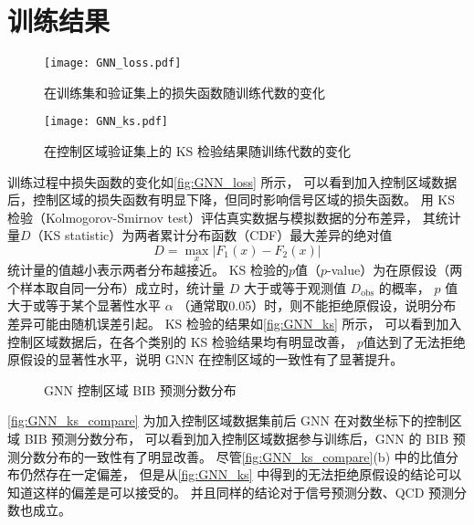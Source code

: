 \section{训练结果}
\begin{figure}[ht]
    \centering
    \texttt{[image: GNN\_loss.pdf]}
    \caption{在训练集和验证集上的损失函数随训练代数的变化}
    \label{fig:GNN_loss}
\end{figure}

\begin{figure}[ht]
    \centering
    \texttt{[image: GNN\_ks.pdf]}
    \caption{在控制区域验证集上的 KS 检验结果随训练代数的变化}
    \label{fig:GNN_ks}
\end{figure}

训练过程中损失函数的变化如\autoref{fig:GNN_loss} 所示，
可以看到加入控制区域数据后，控制区域的损失函数有明显下降，但同时影响信号区域的损失函数。
用 KS 检验（Kolmogorov-Smirnov test）评估真实数据与模拟数据的分布差异，
其统计量$D$（KS statistic）为两者累计分布函数（CDF）最大差异的绝对值
\begin{equation}
    D = \max\limits_{x} |F_1(x) - F_2(x)|
\end{equation}
统计量的值越小表示两者分布越接近。
KS 检验的$p$值（$p$-value）为在原假设（两个样本取自同一分布）成立时，统计量 $D$ 大于或等于观测值 $D_{\text{obs}}$ 的概率，
$p$ 值大于或等于某个显著性水平 $\alpha$ （通常取0.05）时，则不能拒绝原假设，说明分布差异可能由随机误差引起。
KS 检验的结果如\autoref{fig:GNN_ks} 所示，
可以看到加入控制区域数据后，在各个类别的 KS 检验结果均有明显改善，
$p$值达到了无法拒绝原假设的显著性水平，说明 GNN 在控制区域的一致性有了显著提升。

\begin{figure}[ht]
    \centering
    \hfill
    \caption{GNN 控制区域 BIB 预测分数分布}
    \label{fig:GNN_ks_compare}
\end{figure}

\autoref{fig:GNN_ks_compare} 为加入控制区域数据集前后 GNN 在对数坐标下的控制区域 BIB 预测分数分布，
可以看到加入控制区域数据参与训练后，GNN 的 BIB 预测分数分布的一致性有了明显改善。
尽管\autoref{fig:GNN_ks_compare}(b) 中的比值分布仍然存在一定偏差，
但是从\autoref{fig:GNN_ks} 中得到的无法拒绝原假设的结论可以知道这样的偏差是可以接受的。
并且同样的结论对于信号预测分数、QCD 预测分数也成立。

